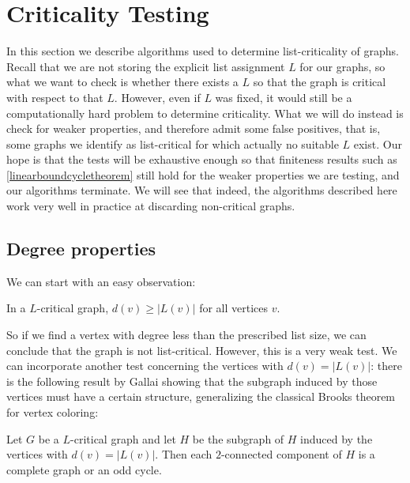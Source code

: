\section{Criticality Testing}

In this section we describe algorithms used to determine list-criticality of graphs. Recall that we are not storing the explicit list assignment $L$ for our graphs, so what we want to check is whether there exists a $L$ so that the graph is critical with respect to that $L$. However, even if $L$ was fixed, it would still be a computationally hard problem to determine criticality. What we will do instead is check for weaker properties, and therefore admit some false positives, that is, some graphs we identify as list-critical for which actually no suitable $L$ exist. Our hope is that the tests will be exhaustive enough so that finiteness results such as \ref{linearboundcycletheorem} still hold for the weaker properties we are testing, and our algorithms terminate. We will see that indeed, the algorithms described here work very well in practice at discarding non-critical graphs. 


\subsection{Degree properties}

We can start with an easy observation:

\begin{Observation}
In a $L$-critical graph, $d(v) \geq |L(v)|$ for all vertices $v$.
\end{Observation}

So if we find a vertex with degree less than the prescribed list size, we can conclude that the graph is not list-critical. 
However, this is a very weak test. We can incorporate another test concerning the vertices with $d(v) = |L(v)|$: there is
the following result by Gallai showing that the subgraph induced by those vertices must have a certain structure, generalizing 
the classical Brooks theorem for vertex coloring:

\begin{theorem}
Let $G$ be a $L$-critical graph and let $H$ be the subgraph
of $H$ induced by the vertices with $d(v) = |L(v)|$. 
Then each $2$-connected component of $H$ is a complete graph or an odd cycle.
\end{theorem}

